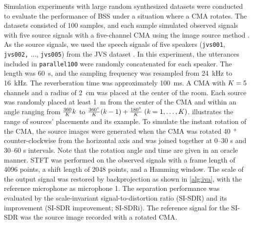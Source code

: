 \documentclass[sip,biber]{now-journal}
\begin{document}
Simulation experiments with large random synthesized datasets were conducted to evaluate the performance of BSS under a situation where a CMA rotates.
The datasets consisted of 100 samples, and each sample simulated observed signals with five source signals with a five-channel CMA using the image source method \cite{Allen:1979:JASA}.
As the source signals, we used the speech signals of five speakers (\texttt{jvs001}, \texttt{jvs002,} $\hdots$, \texttt{jvs005}) from the JVS dataset \cite{Takamichi:2019:arxiv}.
In this experiment, the utterances included in \texttt{parallel100} were randomly concatenated for each speaker.
The length was \SI{60}{\second}, and the sampling frequency was resampled from \SI{24}{\kilo\hertz} to \SI{16}{\kilo\hertz}.
The reverberation time was approximately \SI{100}{\milli\second}.
A CMA with $K = 5$ channels and a radius of \SI{2}{\centi\metre} was placed at the center of the room.
Each source was randomly placed at least \SI{1}{\metre} from the center of the CMA and within an angle ranging from $\frac{360}{K} k$ to $\frac{360\si{\degree}}{K} (k - 1) + \frac{180\si{\degree}}{K}\; (k = 1, \dots, K)$.
 illustrates the range of sources' placements and its example.
To simulate the instant rotation of the CMA, the source images were generated when the CMA was rotated \SI{40}{\degree} counter-clockwise from the horizontal axis and was joined together at 0--30 \si{\second} and 30--60 \si{\second} intervals.
Note that the rotation angle and time are given in an oracle manner.
STFT was performed on the observed signals with a frame length of 4096 points, a shift length of 2048 points, and a Hamming window.
The scale of the output signal was restored by backprojection as shown in \cref{alg:iva}, with the reference microphone as microphone 1.
The separation performance was evaluated by the scale-invariant signal-to-distortion ratio (SI-SDR) \cite{LeRoux:2019:ICASSP} and its improvement (SI-SDR improvement; SI-SDRi).
The reference signal for the SI-SDR was the source image recorded with a rotated CMA.
\end{document}
